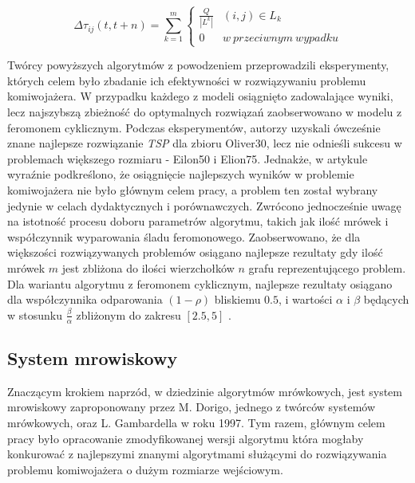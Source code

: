 {{{            \begin{equation}\label{eqt:pheromone-cycle}
                \Delta\tau_{ij}(t, t + n) = \sum_{k=1}^m \left\{
                        \begin{matrix}
                            \frac{Q}{|L^k|} & (i, j) \in L_k\\
                            0 & w\ przeciwnym\ wypadku
                        \end{matrix}
                    \right.
            \end{equation}

            Twórcy powyższych algorytmów z powodzeniem przeprowadzili eksperymenty, których celem było zbadanie ich
            efektywności w rozwiązywaniu problemu komiwojażera. W przypadku każdego z modeli osiągnięto zadowalające
            wyniki, lecz najszybszą zbieżność do optymalnych rozwiązań zaobserwowano w modelu z feromonem cyklicznym.
            Podczas eksperymentów, autorzy uzyskali ówcześnie znane najlepsze rozwiązanie \textit{TSP} dla zbioru
            Oliver30, lecz nie odnieśli sukcesu w problemach większego rozmiaru - Eilon50 i Elion75. Jednakże, w
            artykule wyraźnie podkreślono, że osiągnięcie najlepszych wyników w problemie komiwojażera nie było głównym
            celem pracy, a problem ten został wybrany jedynie w celach dydaktycznych i porównawczych. Zwrócono
            jednocześnie uwagę na istotność procesu doboru parametrów algorytmu, takich jak ilość mrówek i współczynnik
            wyparowania śladu feromonowego. Zaobserwowano, że dla większości rozwiązywanych problemów osiągano najlepsze
            rezultaty gdy ilość mrówek $m$ jest zbliżona do ilości wierzchołków $n$ grafu reprezentującego problem. Dla
            wariantu algorytmu z feromonem cyklicznym, najlepsze rezultaty osiągano dla współczynnika odparowania $(1 -
            \rho)$ bliskiemu $0.5$, i wartości $\alpha$ i $\beta$ będących w stosunku $\frac{\beta}{\alpha}$ zbliżonym
            do zakresu $[2.5, 5]$ \cite{Dorigo1991AntSA}.
        }

        \subsection{System mrowiskowy}
        {
            Znaczącym krokiem naprzód, w dziedzinie algorytmów mrówkowych, jest system mrowiskowy zaproponowany przez M.
            Dorigo, jednego z twórców systemów mrówkowych, oraz L. Gambardella w roku 1997\cite{Dorigo1997AntCS}. Tym
            razem, głównym celem pracy było opracowanie zmodyfikowanej wersji algorytmu która mogłaby konkurować z
            najlepszymi znanymi algorytmami służącymi do rozwiązywania problemu komiwojażera o dużym rozmiarze
            wejściowym.

}}}
